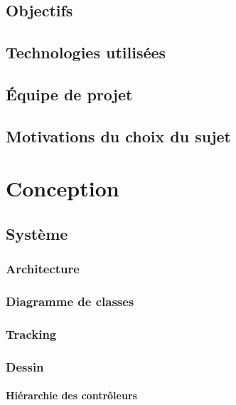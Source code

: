 \documentclass[11pt,a4paper,oldfontcommands]{memoir}
\begin{document}
\section{Objectifs}

\section{Technologies utilisées}

\section{Équipe de projet}

\section{Motivations du choix du sujet}


\chapter{Conception}

\section{Système}

\subsection{Architecture}

\subsection{Diagramme de classes}

\subsection{Tracking}

\subsection{Dessin}

\subsubsection{Hiérarchie des contrôleurs}
\end{document}
